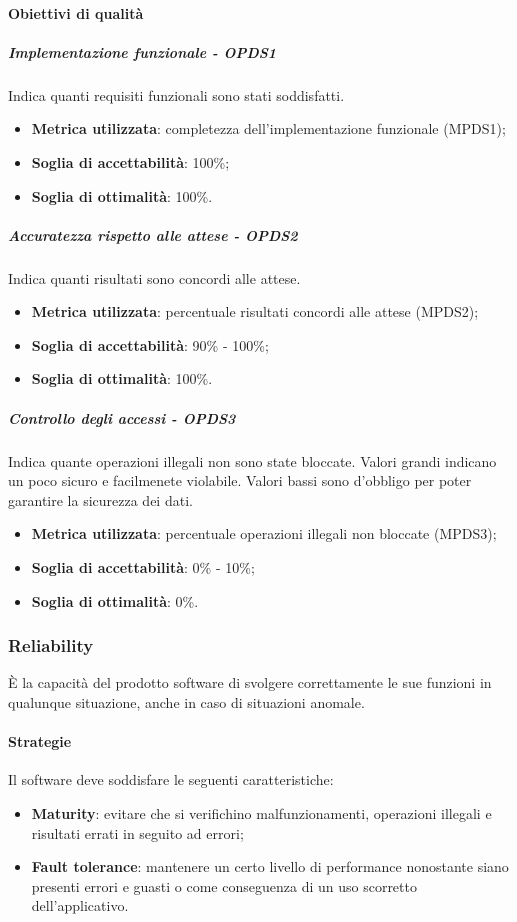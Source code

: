\documentclass[PdQ.tex]{subfiles}
\begin{document}
			\paragraph{Obiettivi di qualità}
				\subparagraph{Implementazione funzionale - OPDS1}
				Indica quanti requisiti funzionali sono stati soddisfatti.
				\begin{itemize}
					\item \textbf{Metrica utilizzata}: completezza dell'implementazione funzionale (MPDS1);
					\item \textbf{Soglia di accettabilità}: 100\%;
					\item \textbf{Soglia di ottimalità}: 100\%.
				\end{itemize}

				\subparagraph{Accuratezza rispetto alle attese - OPDS2}
				Indica quanti risultati sono concordi alle attese.
				\begin{itemize}
					\item \textbf{Metrica utilizzata}: percentuale risultati concordi alle attese (MPDS2);
					\item \textbf{Soglia di accettabilità}: 90\% - 100\%;
					\item \textbf{Soglia di ottimalità}: 100\%.
				\end{itemize}

				\subparagraph{Controllo degli accessi - OPDS3}
				Indica quante operazioni illegali non sono state bloccate. Valori grandi indicano un  poco sicuro e facilmenete violabile.
				Valori bassi sono d'obbligo per poter garantire la sicurezza dei dati.
				\begin{itemize}
					\item \textbf{Metrica utilizzata}: percentuale operazioni illegali non bloccate (MPDS3);
					\item \textbf{Soglia di accettabilità}: 0\% - 10\%;
					\item \textbf{Soglia di ottimalità}: 0\%.
				\end{itemize}

		\subsubsection{Reliability}
		È la capacità del prodotto software di svolgere correttamente le sue funzioni in qualunque situazione, anche in caso di situazioni anomale.

			\paragraph{Strategie}
			Il software deve soddisfare le seguenti caratteristiche:
			\begin{itemize}
				\item \textbf{Maturity}: evitare che si verifichino malfunzionamenti, operazioni illegali e risultati errati in seguito ad errori;
				\item \textbf{Fault tolerance}: mantenere un certo livello di performance nonostante siano presenti errori e guasti o come conseguenza di un uso scorretto dell'applicativo.
			\end{itemize}
\end{document}
